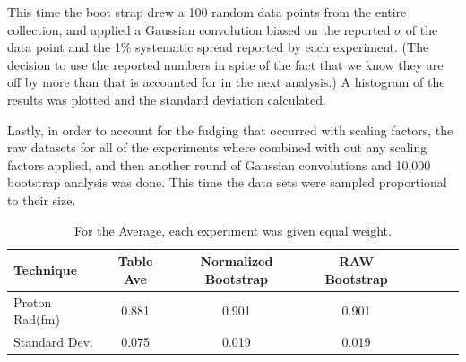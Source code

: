 \documentclass[12pt]{article}
\begin{document}
This time the boot strap drew a 100 random data points from the entire collection, and applied a Gaussian convolution biased on the reported $\sigma$ of the data point and the 1\% systematic spread reported by each experiment.
(The decision to use the reported numbers in spite of the fact that we know they are off by more than that is accounted for in the next analysis.) 
A histogram of the results was plotted and the standard deviation calculated.

Lastly, in order to account for the fudging that occurred with scaling factors, the raw datasets for all of the experiments where combined with out any scaling factors applied, and then another round of Gaussian convolutions and 10,000 bootstrap analysis was done. This time the data sets were sampled proportional to their size. 


\begin{table}[!htb]
  \centering
  \begin{tabular}{|l|c|c|c|c|c|c|c|}
    \hline
    Technique       & Table Ave   & Normalized Bootstrap  & RAW Bootstrap  \\\hline
    Proton Rad(fm)  & 0.881       & 0.901                 & 0.901          \\\hline
    Standard Dev.   & 0.075       & 0.019                 & 0.019          \\\hline
  \end{tabular}
  \caption{For the Average, each experiment was given equal weight.}
\end{table}
\end{document}
